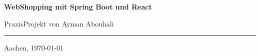 {\begin{titlepage}
\begin{center}
\Huge \textsf{\bfseries WebShopping mit Spring Boot und React}

\vspace{20pt}
\Large PraxisProjekt von Ayman Abouhali      %
\end{center}

  \rule{\textwidth}{2pt}

\vspace{15pt}
\begin{center}
 Aachen, \today
\end{center}

\end{titlepage}
}
\makeatother